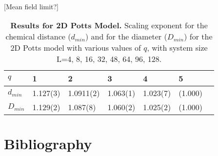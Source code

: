 \documentclass[pre,preprint]{revtex4}
\begin{document}



[Mean field limit?]



\begin{table}[h]
\begin{center}
\begin{tabular}{| l | l | l | l | l | l | l |}
\hline
$q$ & 1 & 2 & 3 & 4 & 5\\
\hline
$d_{min}$ & 1.127(3) & 1.0911(2) & 1.063(1) & 1.023(7) & (1.000) \\
\hline
$D_{min}$ & 1.129(2) & 1.087(8) & 1.060(2) & 1.025(2)& (1.000) \\

\hline
\end{tabular}
\caption{\label{tab:dminD2d} {\bf Results for 2D Potts Model.} Scaling exponent for the chemical distance ($d_{min}$) and for the diameter ($D_{min}$) for the 2D Potts model with various values of $q$, with system size L=4, 8, 16, 32, 48, 64, 96, 128.}
\end{center}
\end{table}




\section{Bibliography}

{}
\end{document}
